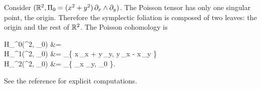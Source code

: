 \begin{example}
	Consider $(\mathbb{R}^2, \Pi_0 = (x^2+y^2)\,\partial_x \wedge \partial_y)$. The Poisson tensor has only one singular point, the origin. Therefore the symplectic foliation is composed of two leaves: the origin and the rest of $\mathbb{R}^2$. The Poisson cohomology is
	\begin{eqalign}
		H_\Pi^0(\R^2, \Pi_0) &= \R {}\\
		H_\Pi^1(\R^2, \Pi_0) &= _\R \{ x\,\partial_x + y\,\partial_y,\; y\,\partial_x - x\,\partial_y \}\\
		H_\Pi^2(\R^2, \Pi_0) &= _\R \{ \partial_x \wedge \partial_y,\; \Pi_0 \}.
	\end{eqalign}
	See the reference for explicit computations.
\end{example}
